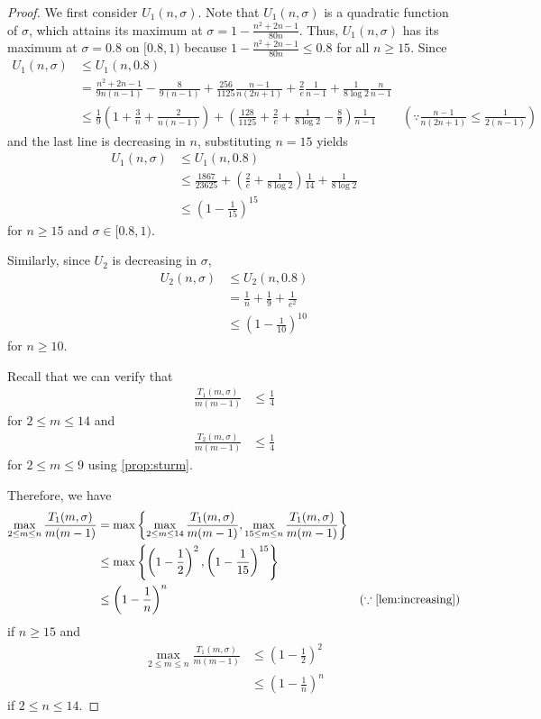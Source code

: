 \documentclass{article}
\theoremstyle{plain}
\theoremstyle{definition}
\theoremstyle{remark}
\def\bigopen#1{\left(#1\right)}
\def\bigset#1{\left\{#1\right\}}
\begin{document}
\begin{proof}
We first consider $U_1(n, \sigma)$. Note that $U_1(n, \sigma)$ is a quadratic function of $\sigma$, which attains its maximum at $\sigma=1-\frac{n^2+2n-1}{80n}$. Thus, $U_1(n, \sigma)$ has its maximum at $\sigma=0.8$ on $[0.8, 1)$ because $1-\frac{n^2+2n-1}{80n} \le 0.8$ for all $n\ge 15$. Since  
\begin{align*}
    U_1(n,\sigma) &\le U_1(n, 0.8) \\
    &= \frac{n^2+2n-1}{9n(n-1)} - \frac{8}{9(n-1)} + \frac{256}{1125} \frac{n-1}{n(2n+1)} + \frac{2}{e} \frac{1}{n-1}+ \frac{1}{8 \log 2} \frac{n}{n-1} \\
    &\le \frac{1}{9}\bigopen{1+\frac{3}{n}+\frac{2}{n(n-1)}} + \bigopen{\frac{128}{1125} + \frac{2}{e} + \frac{1}{8\log 2} - \frac{8}{9}} \frac{1}{n-1} & \bigopen{\because \frac{n-1}{n(2n+1)} \le \frac{1}{2(n-1)}}
\end{align*}
and the last line is decreasing in $n$, substituting $n=15$ yields 
\begin{align*}
    U_1(n,\sigma) &\le U_1(n, 0.8) \\
    &\le \frac{1867}{23625} + \bigopen{\frac{2}{e} + \frac{1}{8\log 2}}\frac{1}{14} + \frac{1}{8\log 2} \\
    &\le \bigopen{1-\frac{1}{15}}^{15}
\end{align*}
for $n\ge 15$ and $\sigma\in [0.8, 1)$.

Similarly, since $U_2$ is decreasing in $\sigma$, 
\begin{align*}
    U_2(n,\sigma) &\le U_2(n, 0.8) \\
    &= \frac{1}{n} + \frac{1}{9} + \frac{1}{e^2} \\
    &\le \bigopen{1-\frac{1}{10}}^{10}
\end{align*}
for $n\ge 10$.

Recall that we can verify that 
\begin{align*}
    \frac{T_1(m, \sigma)}{m(m-1)} &\le \frac{1}{4}
\end{align*}
for $2\le m\le 14$ and 
\begin{align*}
    \frac{T_2(m, \sigma)}{m(m-1)} &\le \frac{1}{4}
\end{align*}
for $2\le m\le 9$ using \cref{prop:sturm}.

Therefore, we have 
\begin{align*}
    \max_{2\le m\le n} \frac{T_1(m, \sigma)}{m(m-1)} &= \max \bigset{\max_{2\le m\le 14}\frac{T_1(m, \sigma)}{m(m-1)}, \max_{15\le m\le n} \frac{T_1(m, \sigma)}{m(m-1)}} \\
    &\le \max\bigset{\bigopen{1-\frac{1}{2}}^2, \bigopen{1-\frac{1}{15}}^{15}} \\
    &\le \bigopen{1-\frac{1}{n}}^n & (\because \text{\cref{lem:increasing}})
\end{align*}
if $n\ge 15$ and 
\begin{align*}
    \max_{2\le m\le n} \frac{T_1(m, \sigma)}{m(m-1)} &\le \bigopen{1-\frac{1}{2}}^2\\
    &\le \bigopen{1-\frac{1}{n}}^n
\end{align*}
if $2\le n \le 14$.


\end{proof}
\end{document}
